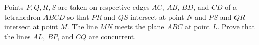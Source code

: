 Points $P,Q,R,S$ are taken on respective edges $AC$, $AB$, $BD$, and $CD$ of a tetrahedron $ABCD$ so that $PR$ and $QS$ intersect at point $N$ and $PS$ and $QR$ intersect at point $M$. The line $MN$ meets the plane $ABC$ at point $L$. Prove that the lines $AL$, $BP$, and $CQ$ are concurrent.